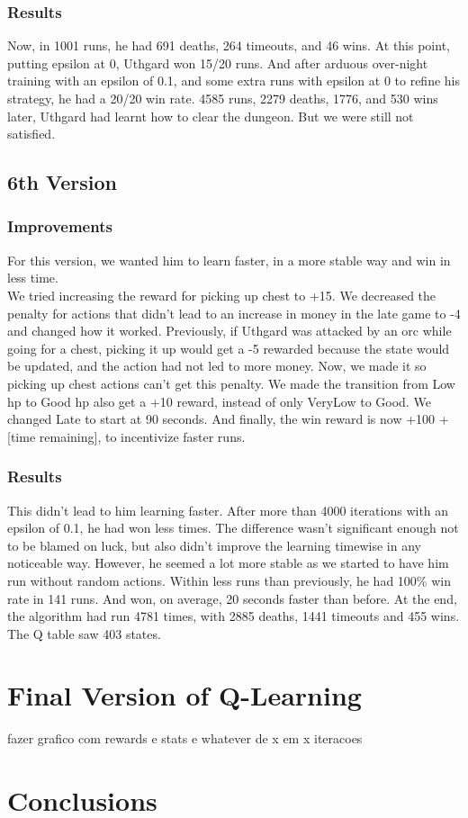 \documentclass{article}
\begin{document}
  \subsubsection{Results}

  Now, in 1001 runs, he had 691 deaths, 264 timeouts, and 46 wins. At this point, putting epsilon at 0, Uthgard won 15/20 runs. And after arduous over-night training with an epsilon of 0.1, and some extra runs with epsilon at 0 to refine his strategy, he had a 20/20 win rate. 
  4585 runs, 2279 deaths, 1776, and 530 wins later, Uthgard had learnt how to clear the dungeon. But we were still not satisfied.

  \subsection{6th Version}

  \subsubsection{Improvements}

  For this version, we wanted him to learn faster, in a more stable way and win in less time.\\
  We tried increasing the reward for picking up chest to +15. We decreased the penalty for actions that didn't lead to an increase in money in the late game to -4 and changed how it worked. Previously, if Uthgard was attacked by an orc while going for a chest, picking it up would get a -5 rewarded because the state would be updated, and the action had not led to more money. 
  Now, we made it so picking up chest actions can't get this penalty. We made the transition from Low hp to Good hp also get a +10 reward, instead of only VeryLow to Good. We changed Late to start at 90 seconds. And finally, the win reward is now +100 + [time remaining], to incentivize faster runs.

  \subsubsection{Results}

  This didn't lead to him learning faster. After more than 4000 iterations with an epsilon of 0.1, he had won less times. The difference wasn't significant enough not to be blamed on luck, but also didn't improve the learning timewise in any noticeable way.
  However, he seemed a lot more stable as we started to have him run without random actions. Within less runs than previously, he had 100\% win rate in 141 runs. And won, on average, 20 seconds faster than before. At the end, the algorithm had run 4781 times, with 2885 deaths, 1441 timeouts and 455 wins. The Q table saw 403 states.

  \section{Final Version of Q-Learning}

  fazer grafico com rewards e stats e whatever de x em x iteracoes

  \section{Conclusions}
  
\end{document}
